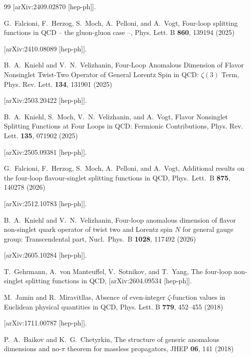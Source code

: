 \documentclass[
 twocolumn,
 superscriptaddress,
 preprintnumbers,
 nofootinbib,
 amsmath,amssymb,
 aps,
 prl
 ]{revtex4-2}
\begin{document}
\begin{thebibliography}{99}
[arXiv:2409.02870 [hep-ph]].



G.~Falcioni, F.~Herzog, S.~Moch, A.~Pelloni, and A.~Vogt,
Four-loop splitting functions in QCD -- the gluon-gluon case --,
Phys. Lett. B \textbf{860}, 139194 (2025)

[arXiv:2410.08089 [hep-ph]].



B.~A.~Kniehl and V.~N.~Velizhanin,
Four-Loop Anomalous Dimension of Flavor Nonsinglet Twist-Two Operator of General Lorentz Spin in QCD: $\zeta(3)$ Term,
Phys. Rev. Lett. \textbf{134}, 131901 (2025)

[arXiv:2503.20422 [hep-ph]].



B.~A.~Kniehl, S.~Moch, V.~N.~Velizhanin, and A.~Vogt,
Flavor Nonsinglet Splitting Functions at Four Loops in QCD: Fermionic Contributions,
Phys. Rev. Lett. \textbf{135}, 071902 (2025)

[arXiv:2505.09381 [hep-ph]].



G.~Falcioni, F.~Herzog, S.~Moch, A.~Pelloni, and A.~Vogt,
Additional results on the four-loop flavour-singlet splitting functions in QCD,
Phys.\ Lett.\ B \textbf{875}, 140278 (2026)

[arXiv:2512.10783 [hep-ph]].



B.~A.~Kniehl and V.~N.~Velizhanin,
Four-loop anomalous dimension of flavor non-singlet quark operator of twist two and Lorentz spin $N$ for general gauge group: Transcendental part,
Nucl.\ Phys.\ B \textbf{1028}, 117492 (2026)

[arXiv:2605.10284 [hep-ph]].



T.~Gehrmann, A.~von Manteuffel, V.~Sotnikov, and T.~Yang,
The four-loop non-singlet splitting functions in QCD,
[arXiv:2604.09534 [hep-ph]].



M.~Jamin and R.~Miravitllas,
Absence of even-integer $\zeta$-function values in Euclidean physical quantities in QCD,
Phys. Lett. B \textbf{779}, 452--455 (2018)

[arXiv:1711.00787 [hep-ph]].



P.~A.~Baikov and K.~G.~Chetyrkin,
The structure of generic anomalous dimensions and no-$\pi$ theorem for massless propagators,
JHEP \textbf{06}, 141 (2018)


\end{thebibliography}
\end{document}
